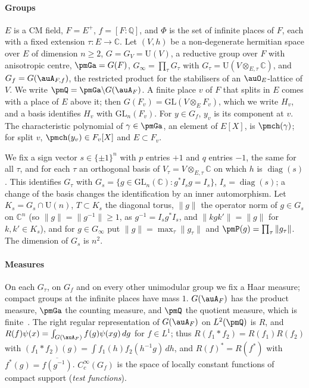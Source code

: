 \documentclass[10pt]{amsart}
\theoremstyle{definition}
\theoremstyle{remark}
\newcommand{\C}{\mathbb C}
\newcommand{\Q}{\mathbb Q}
\providecommand{\auGL}{\mathrm{GL}}
\providecommand{\auPl}{\Phi}
\providecommand{\auU}{\mathrm U}
\providecommand{\aubar}[1]{\overline{#1}}
\begin{document}
\paragraph*{Groups}
$E$ is a CM field, $F=E^+$, $f=[F:\Q]$, and $\auPl$ is the set of infinite places of $F$, each
with a fixed extension $\tau\colon E\to\C$. Let $(V,h)$ be a non-degenerate hermitian space over
$E$ of dimension $n\ge2$, $G=G_V=\auU(V)$, a reductive group over $F$ with anisotropic centre,
$\pmGa=G(F)$, $G_\infty=\prod_{\tau}G_\tau$ with $G_\tau=\auU(V\otimes_{E,\tau}\C)$, and
$G_f=G(\auA_{F,f})$, the restricted product for the stabilisers of an $\auO_E$-lattice of $V$.
We write $\pmQ=\pmGa\backslash G(\auA_F)$. A finite place $v$ of $F$ that splits in $E$ comes
with a place of $E$ above it; then $G(F_v)=\auGL(V\otimes_EF_v)$, which we write $H_v$, and a basis
identifies $H_v$ with $\auGL_n(F_v)$. For $y\in G_f$, $y_v$ is its component at $v$.
The characteristic polynomial of $\gamma\in\pmGa$, an element of $E[X]$, is $\pmch(\gamma)$; for
split $v$, $\pmch(y_v)\in F_v[X]$ and $E\subset F_v$.

We fix a sign vector $s\in\{\pm1\}^n$ with $p$ entries $+1$ and $q$ entries $-1$, the same for all
$\tau$, and for each $\tau$ an orthogonal basis of $V_\tau=V\otimes_{E,\tau}\C$ on which $h$ is
$\operatorname{diag}(s)$. This identifies $G_\tau$ with $G_s=\{g\in\auGL_n(\C):g^*I_sg=I_s\}$,
$I_s=\operatorname{diag}(s)$; a change of the basis changes the identification by an inner
automorphism. Let $K_s=G_s\cap\auU(n)$, $T\subset K_s$ the diagonal torus, $\|g\|$ the operator
norm of $g\in G_s$ on $\C^n$ (so $\|g\|=\|g^{-1}\|\ge1$, as $g^{-1}=I_sg^*I_s$, and $\|kgk'\|=\|g\|$
for $k,k'\in K_s$), and for $g\in G_\infty$ put $\|g\|=\max_\tau\|g_\tau\|$ and
$\pmP(g)=\prod_\tau\|g_\tau\|$. The dimension of $G_s$ is $n^2$.

\paragraph*{Measures}
On each $G_\tau$, on $G_f$ and on every other unimodular group we fix a Haar measure; compact
groups at the infinite places have mass $1$. $G(\auA_F)$ has the product measure, $\pmGa$ the
counting measure, and $\pmQ$ the quotient measure, which is finite~\cite[Theorem~5.6(i)]{BorelFin}. The right
regular representation of $G(\auA_F)$ on $L^2(\pmQ)$ is $R$, and
$R(f)\psi(x)=\int_{G(\auA_F)}f(g)\psi(xg)\,dg$ for $f\in L^1$; thus $R(f_1*f_2)=R(f_1)R(f_2)$ with
$(f_1*f_2)(g)=\int f_1(h)f_2(h^{-1}g)\,dh$, and $R(f)^*=R(f^*)$ with $f^*(g)=\aubar{f(g^{-1})}$.
$C_c^\infty(G_f)$ is the space of locally constant functions of compact support (\emph{test
functions}).
\end{document}
